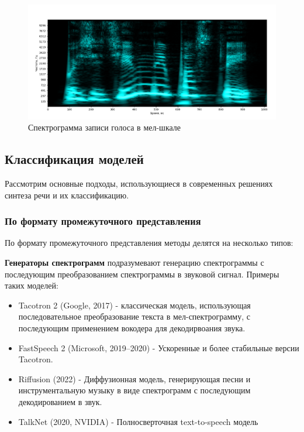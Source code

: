 \begin{figure}[t]
  \centering
  \includegraphics[width=16cm]{figures/mel_spec}
  \caption{Спектрограмма записи голоса в мел-шкале}
  \label{fig:mel_spec}
\end{figure}




\subsection{Классификация моделей}
Рассмотрим основные подходы, использующиеся в современных решениях синтеза речи и их классификацию.


\subsubsection{По формату промежуточного представления}
По формату промежуточного представления методы делятся на несколько типов:

\textbf{Генераторы спектрограмм} подразумевают генерацию спектрограммы с последующим преобразованием спектрограммы в звуковой сигнал. Примеры таких моделей:
\begin{itemize}
  \item Tacotron 2 (Google, 2017) \cite{Tacotron2} - классическая модель, использующая последовательное преобразование текста в мел-спектрограмму, с последующим применением вокодера для декодирвоания звука.
  \item FastSpeech 2 (Microsoft, 2019–2020) \cite{FastSpeech2} - Ускоренные и более стабильные версии Tacotron.
  \item Riffusion (2022) \cite{Riffusion} - Диффузионная модель, генерирующая песни и инструментальную музыку в виде спектрограмм с последующим декодированием в звук.
  \item TalkNet (2020, NVIDIA) \cite{TalkNet} - Полносверточная text-to-speech модель
\end{itemize}

